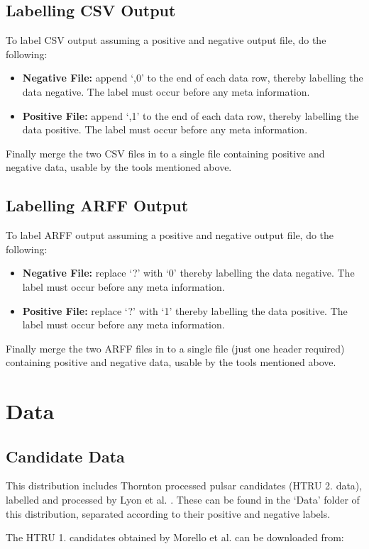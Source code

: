 \documentclass[twoside,a4paper]{refart}
\begin{document}
\subsection{Labelling CSV Output}
To label CSV output assuming a positive and negative output file, do the following:
\begin{itemize}
\item \textbf{Negative File:} append `,0' to the end of each data row, thereby labelling the data negative. The label must occur before any meta information.
\item \textbf{Positive File:} append `,1' to the end of each data row, thereby labelling the data positive. The label must occur before any meta information.
\end{itemize}
Finally merge the two CSV files in to a single file containing positive and negative data, usable by the tools mentioned above.
\subsection{Labelling ARFF Output}
To label ARFF output assuming a positive and negative output file, do the following:
\begin{itemize}
\item \textbf{Negative File:} replace `?' with `0' thereby labelling the data negative. The label must occur before any meta information.
\item \textbf{Positive File:} replace `?' with `1' thereby labelling the data positive. The label must occur before any meta information.
\end{itemize}
Finally merge the two ARFF files in to a single file (just one header required) containing positive and negative data, usable by the tools mentioned above.\newpage
\section{Data}
\subsection{Candidate Data}
This distribution includes Thornton processed \cite{ThorntonPhD:1} pulsar candidates (HTRU 2. data), labelled and processed by Lyon et al. \cite{Lyon:2015:jk}. These can be found in the `Data' folder of this distribution, separated according to their positive and negative labels.

The HTRU 1. candidates obtained by Morello et al. \cite{Morello:2014:eb} can be downloaded from:
\end{document}
